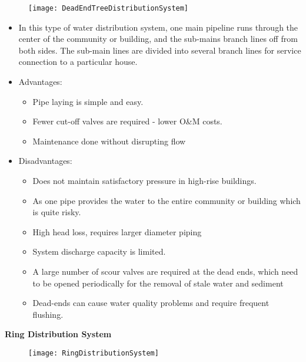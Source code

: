     \begin{figure}[H]
        \begin{center}
     \texttt{[image: DeadEndTreeDistributionSystem]}\\
    \end{center}    
    \end{figure}
\begin{itemize}
\item In this type of water distribution system, one main pipeline runs through the center of the community or building, and the sub-mains branch lines off from both sides. The sub-main lines are  divided into several branch lines for service connection to a particular house.\\
\item Advantages:
      \begin{itemize}[leftmargin=*]
        \item Pipe laying is simple and easy.
        \item Fewer cut-off valves are required - lower O\&M costs.
        \item Maintenance done without disrupting flow
      \end{itemize}
\item Disadvantages:
		\begin{itemize}
		        \item Does not maintain satisfactory pressure in high-rise buildings.
        \item As one pipe provides the water to the entire community or building which is quite risky.
        \item High head loss, requires larger diameter piping
        \item System discharge capacity is limited.
        \item A large number of scour valves are required at the dead ends, which need to be opened periodically for the removal of stale water and sediment
        \item Dead-ends can cause water quality problems and require frequent flushing.
		\end{itemize}
		\end{itemize}
		\newpage
\textbf{Ring Distribution System} \\
    \begin{figure}[h!]
        \begin{center}
     \texttt{[image: RingDistributionSystem]}\\
    \end{center}    
    \end{figure}
